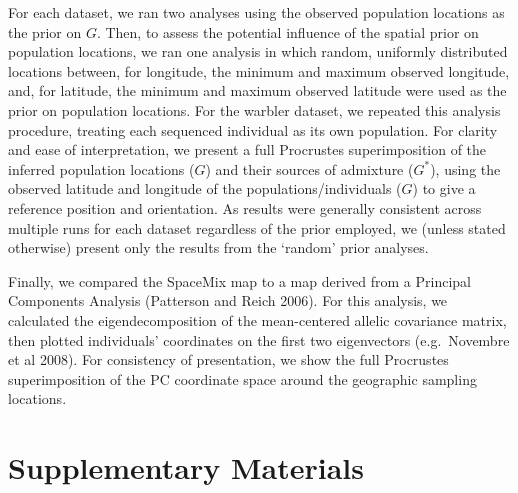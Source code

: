 \documentclass[12pt]{article}
\newcommand{\identifyadmixsource}[1]{{#1^{*}}}
\begin{document}
For each dataset, we ran two analyses using the observed population locations as the prior on $G$.  
Then, to assess the potential influence of the spatial prior on population locations, 
we ran one analysis in which random, uniformly distributed locations between, 
for longitude, the minimum and maximum observed longitude, 
and, for latitude, the minimum and maximum observed latitude were used as the prior on population locations.  
For the warbler dataset, we repeated this analysis procedure, treating each sequenced individual as its own population.  
For clarity and ease of interpretation, we present a full Procrustes superimposition of the inferred population locations ($G$) 
and their sources of admixture ($\identifyadmixsource{G}$), 
using the observed latitude and longitude of the populations/individuals ($G$) to give a reference position and orientation.  
As results were generally consistent across multiple runs for each dataset regardless of the prior employed, 
we (unless stated otherwise) present only the results from the `random' prior analyses.

Finally, we compared the SpaceMix map to a map derived from a Principal Components Analysis (Patterson and Reich 2006).  For this analysis, we calculated the eigendecomposition of the mean-centered allelic covariance matrix, then plotted individuals' coordinates on the first two eigenvectors (e.g.\ Novembre et al 2008).  For consistency of presentation, we show the full Procrustes superimposition of the PC coordinate space around the geographic sampling locations.


\newpage



\newpage



\section*{Supplementary Materials}
\renewcommand{\thefigure}{S\arabic{figure}}
\setcounter{figure}{0}
\renewcommand{\thetable}{S\arabic{table}}
\setcounter{table}{0}
\renewcommand{\theequation}{S\arabic{table}}
\setcounter{equation}{0}
\end{document}
